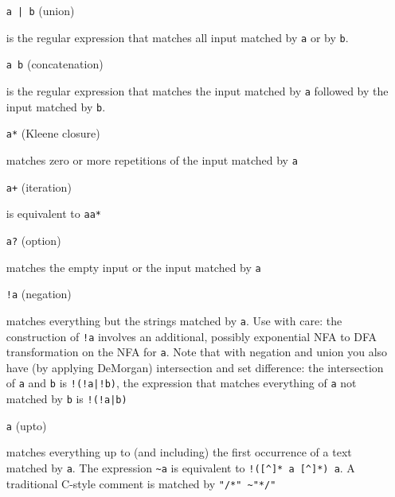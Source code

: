 \documentclass[11pt]{scrartcl}
\begin{document}
    \begin{itemize}
     
          \item[\texttt{a | b}] (union) 

            is the regular expression that matches
            all input matched by \texttt{a} or by \texttt{b}.
          
          
          \item[\texttt{a b}] (concatenation) 
            
            is the regular expression
            that matches the input matched by \texttt{a} followed by the 
            input matched by \texttt{b}.
          
          
          \item[\texttt{a*}] (Kleene closure) 

            matches zero or more repetitions
            of the input matched by \texttt{a}
          
          
          \item[\texttt{a+}] (iteration)

          is equivalent to \texttt{aa*}
          
          
          \item[\texttt{a?}] (option)

          matches the empty input or the input matched
            by \texttt{a}

          \item[\texttt{!a}] (negation)

          matches everything but the strings matched by \texttt{a}. 
          Use with care: the construction of \verb+!a+ involves
          an additional, possibly exponential NFA to DFA transformation 
          on the NFA for \texttt{a}. Note that
          with negation and union you also have (by applying DeMorgan)
          intersection and set difference: the intersection of 
          \texttt{a} and \texttt{b} is \verb+!(!a|!b)+, the expression 
          that matches everything of \texttt{a} not matched by \texttt{b} is 
          \verb+!(!a|b)+

          \item[\texttt{\symbol{126}a}] (upto)

          matches everything up to (and including) the first occurrence of a text
          matched by \texttt{a}. The expression \verb-~a- is equivalent
          to \verb-!([^]* a [^]*) a-. A traditional C-style comment
          is matched by \verb-"/*" ~"*/"-
          

\end{itemize}
\end{document}
